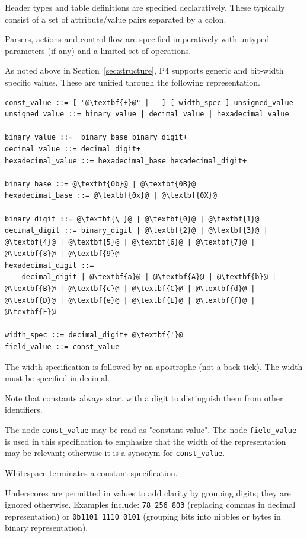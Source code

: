\documentclass[12pt]{article}
\begin{document}
Header types and table definitions are specified declaratively.  These
typically consist of a set of attribute/value pairs separated by a
colon.

Parsers, actions and control flow are specified imperatively with
untyped parameters (if any) and a limited set of operations.


As noted above in Section~\ref{sec:structure}, P4 supports 
generic and bit-width specific values. These are unified through the following 
representation.

\begin{lstlisting}[frame=single,backgroundcolor=\color{bnfgreen},escapechar=\@]
const_value ::= [ "@\textbf{+}@" | - ] [ width_spec ] unsigned_value
unsigned_value ::= binary_value | decimal_value | hexadecimal_value

binary_value ::=  binary_base binary_digit+
decimal_value ::= decimal_digit+
hexadecimal_value ::= hexadecimal_base hexadecimal_digit+

binary_base ::= @\textbf{0b}@ | @\textbf{0B}@
hexadecimal_base ::= @\textbf{0x}@ | @\textbf{0X}@

binary_digit ::= @\textbf{\_}@ | @\textbf{0}@ | @\textbf{1}@
decimal_digit ::= binary_digit | @\textbf{2}@ | @\textbf{3}@ | @\textbf{4}@ | @\textbf{5}@ | @\textbf{6}@ | @\textbf{7}@ | @\textbf{8}@ | @\textbf{9}@
hexadecimal_digit ::= 
    decimal_digit | @\textbf{a}@ | @\textbf{A}@ | @\textbf{b}@ | @\textbf{B}@ | @\textbf{c}@ | @\textbf{C}@ | @\textbf{d}@ | @\textbf{D}@ | @\textbf{e}@ | @\textbf{E}@ | @\textbf{f}@ | @\textbf{F}@

width_spec ::= decimal_digit+ @\textbf{'}@
field_value ::= const_value
\end{lstlisting}

The width specification is followed by an apostrophe (not a back-tick). The 
width must be specified in decimal.

Note that constants always start with a digit to distinguish them from other 
identifiers.

The node \texttt{const_value} may be read as "constant value". The node \texttt{field_value} is 
used in this specification to emphasize that the width of the representation 
may be relevant; otherwise it is a synonym for \texttt{const_value}.

Whitespace terminates a constant specification.

Underscores are permitted in values to add clarity by grouping digits; they 
are ignored otherwise.  Examples include: \texttt{78_256_803} (replacing commas 
in decimal representation) or \texttt{0b1101_1110_0101} (grouping bits into nibbles 
or bytes in binary representation).
\end{document}
